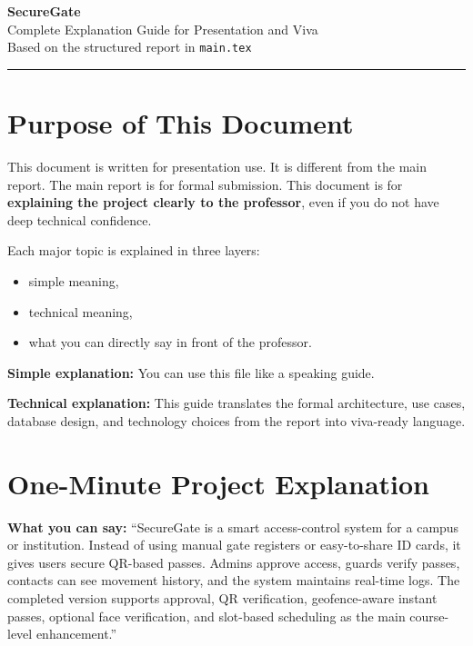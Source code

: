 \documentclass[12pt,letterpaper]{article}
\newcommand{\simple}[1]{\textbf{Simple explanation:} #1}
\newcommand{\technical}[1]{\textbf{Technical explanation:} #1}
\newcommand{\say}[1]{\textbf{What you can say:} ``#1''}
\begin{document}
\begin{center}
    {\LARGE \textbf{SecureGate}} \\[4pt]
    {\large Complete Explanation Guide for Presentation and Viva} \\[6pt]
    {\normalsize Based on the structured report in \texttt{main.tex}} \\[2pt]
\end{center}
\vspace{2pt}
\hrule
\vspace{10pt}

\section{Purpose of This Document}

This document is written for presentation use. It is different from the main report. The main report is for formal submission. This document is for \textbf{explaining the project clearly to the professor}, even if you do not have deep technical confidence.

Each major topic is explained in three layers:
\begin{itemize}
    \item simple meaning,
    \item technical meaning,
    \item what you can directly say in front of the professor.
\end{itemize}

\simple{You can use this file like a speaking guide.}

\technical{This guide translates the formal architecture, use cases, database design, and technology choices from the report into viva-ready language.}

\section{One-Minute Project Explanation}

\say{SecureGate is a smart access-control system for a campus or institution. Instead of using manual gate registers or easy-to-share ID cards, it gives users secure QR-based passes. Admins approve access, guards verify passes, contacts can see movement history, and the system maintains real-time logs. The completed version supports approval, QR verification, geofence-aware instant passes, optional face verification, and slot-based scheduling as the main course-level enhancement.}
\end{document}
